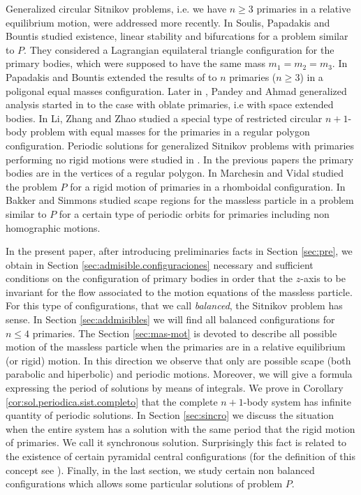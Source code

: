 \documentclass[twoside]{article}
\theoremstyle{remark}
\begin{document}
Generalized circular Sitnikov problems, i.e. we have $n\geq 3$ primaries in a relative equilibrium motion,   were addressed more recently.
In \cite{soulis2008periodic} Soulis, Papadakis and Bountis studied existence, linear stability and bifurcations for a problem similar to $P$. They considered  a Lagrangian equilateral triangle configuration for the primary bodies, which were supposed to have the same mass $m_1=m_2=m_3$. In \cite{bountis2009stability} Papadakis and Bountis extended the results of \cite{soulis2008periodic} to $n$ primaries ($n\geq 3$) in a poligonal equal masses configuration. Later  in \cite{pandey2013periodic}, Pandey and Ahmad generalized  analysis started in \cite{soulis2008periodic} to the case with oblate primaries, i.e with space extended bodies.
In \cite{li2013characterization} Li, Zhang and Zhao studied a special type of
restricted circular $n+1$-body problem  with equal masses for the primaries in a regular polygon configuration. Periodic solutions for generalized Sitnikov problems with primaries performing  no rigid motions were studied in \cite{pustyl1990certain,rivera2013periodic}. In the previous papers the primary bodies are in the vertices of a regular polygon. In \cite{marchesin2013spatial} Marchesin and Vidal studied the problem $P$ for a rigid motion  of primaries in a  rhomboidal configuration.
 In \cite{bakker2015separating} Bakker and Simmons studied scape regions for the massless particle in a problem similar to $P$ for a certain type of periodic orbits for primaries including non homographic motions.


In the present paper, after introducing preliminaries facts in Section \ref{sec:pre},   we
obtain in Section \ref{sec:admisible.configuraciones} necessary and sufficient conditions on the configuration of primary bodies in order  that the $z$-axis to be invariant for the flow associated to the motion equations of the massless particle. For this type of configurations, that we call \emph{balanced}, the Sitnikov problem has sense.  In Section \ref{sec:addmisibles} we will find all balanced configurations for $n\leq 4$ primaries.  The Section \ref{sec:mas-mot} is devoted to describe all possible motion of the massless particle when the primaries are in a relative equilibrium (or rigid) motion. In this direction we observe that only are possible scape (both parabolic and hiperbolic) and periodic motions. Moreover, we will give a formula expressing the period of solutions  by means of integrals.  We prove in Corollary \ref{cor:sol.periodica.sist.completo} that the complete $n+1$-body system has  infinite quantity of periodic solutions. In Section  \ref{sec:sincro} we discuss the
situation when the entire system has a solution with the same period that the rigid motion of primaries. We call it synchronous solution. Surprisingly this fact is related to the existence of certain pyramidal central configurations (for the definition of this concept see \cite{fayccal1996classification,faycaltesis,ouyang2004pyramidal}). Finally, in the last section, we study certain non balanced configurations which allows some particular solutions of problem $P$.
\end{document}
